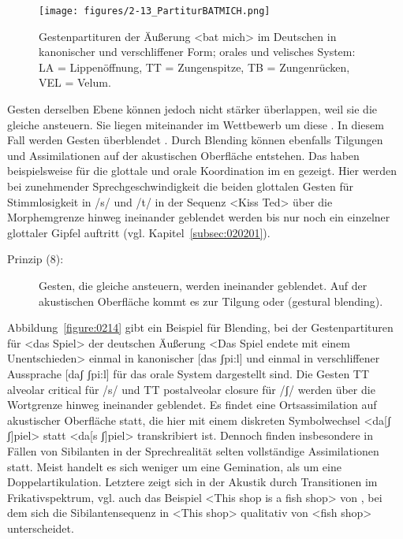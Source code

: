 \begin{figure}[t]
	\texttt{[image: figures/2-13\_PartiturBATMICH.png]}
	\caption{Gestenpartituren der Äußerung <bat mich> im Deutschen in kanonischer und verschliffener Form; orales und velisches System: LA = Lippenöffnung, TT = Zungenspitze, TB = Zungenrücken, VEL = Velum.}
	\label{figure:0213}
\end{figure}

 \largerpage
Gesten derselben Ebene können jedoch nicht stärker überlappen, weil sie die gleiche  ansteuern. Sie liegen miteinander im Wettbewerb um diese  \citep{Browman1989}. In diesem Fall werden Gesten überblendet \citep{Fowler1993}. Durch Blending können ebenfalls Tilgungen und Assimilationen auf der akustischen Oberfläche entstehen. Das haben beispielsweise \citet{Munhall1988} für die glottale und orale Koordination im en gezeigt. Hier werden bei zunehmender Sprechgeschwindigkeit die beiden glottalen Gesten für Stimmlosigkeit in /s/ und /t/ in der Sequenz <Kiss Ted> über die Morphemgrenze hinweg ineinander geblendet werden bis nur noch ein einzelner glottaler Gipfel auftritt (vgl. Kapitel~\ref{subsec:020201}).
 
\begin{description}
	\item[Prinzip (8):] Gesten, die gleiche  ansteuern, werden ineinander geblendet. Auf der akustischen Oberfläche kommt es zur Tilgung oder  (gestural blending).
\end{description}

Abbildung~\ref{figure:0214} gibt ein Beispiel für Blending, bei der Gestenpartituren für <das Spiel> der deutschen Äußerung <Das Spiel endete mit einem Unentschieden> einmal in kanonischer [das ʃpi:l] und einmal in verschliffener Aussprache [daʃ ʃpi:l] für das orale System dargestellt sind. Die Gesten {TT alveolar critical} für /s/ und {TT postalveolar closure} für /ʃ/ werden über die Wortgrenze hinweg ineinander geblendet. Es findet eine Ortsassimilation auf akustischer Oberfläche statt, die hier mit einem diskreten Symbolwechsel <da[ʃ ʃ]piel> statt <da[s ʃ]piel> transkribiert ist. Dennoch finden insbesondere in Fällen von Sibilanten in der Sprechrealität selten vollständige Assimilationen statt. Meist handelt es sich weniger um eine Gemination, als um eine Doppelartikulation. Letztere zeigt sich in der Akustik durch Transitionen im Frikativspektrum, vgl. auch das Beispiel <This shop is a fish shop> von \citet{Holst1995}, bei dem sich die Sibilantensequenz in <This shop> qualitativ von <fish shop> unterscheidet.


